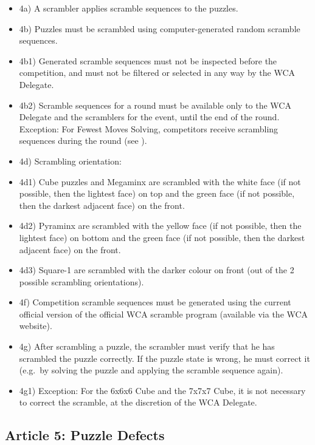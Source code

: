 \begin{itemize}
\item
  4a) A scrambler applies scramble sequences to the puzzles.
\item
  4b) Puzzles must be scrambled using computer-generated random scramble
  sequences.
\item
  4b1) Generated scramble sequences must not be inspected before the
  competition, and must not be filtered or selected in any way by the
  WCA Delegate.
\item
  4b2) Scramble sequences for a round must be available only to the WCA
  Delegate and the scramblers for the event, until the end of the round.
  Exception: For Fewest Moves Solving, competitors receive scrambling
  sequences during the round (see ).
\item
  4d) Scrambling orientation:
\item
  4d1) Cube puzzles and Megaminx are scrambled with the white face (if
  not possible, then the lightest face) on top and the green face (if
  not possible, then the darkest adjacent face) on the front.
\item
  4d2) Pyraminx are scrambled with the yellow face (if not possible,
  then the lightest face) on bottom and the green face (if not possible,
  then the darkest adjacent face) on the front.
\item
  4d3) Square-1 are scrambled with the darker colour on front (out of
  the 2 possible scrambling orientations).
\item
  4f) Competition scramble sequences must be generated using the current
  official version of the official WCA scramble program (available via
  the WCA website).
\item
  4g) After scrambling a puzzle, the scrambler must verify that he has
  scrambled the puzzle correctly. If the puzzle state is wrong, he must
  correct it (e.g.~by solving the puzzle and applying the scramble
  sequence again).
\item
  4g1) Exception: For the 6x6x6 Cube and the 7x7x7 Cube, it is not
  necessary to correct the scramble, at the discretion of the WCA
  Delegate.
\end{itemize}

\subsection{ Article 5: Puzzle Defects}

